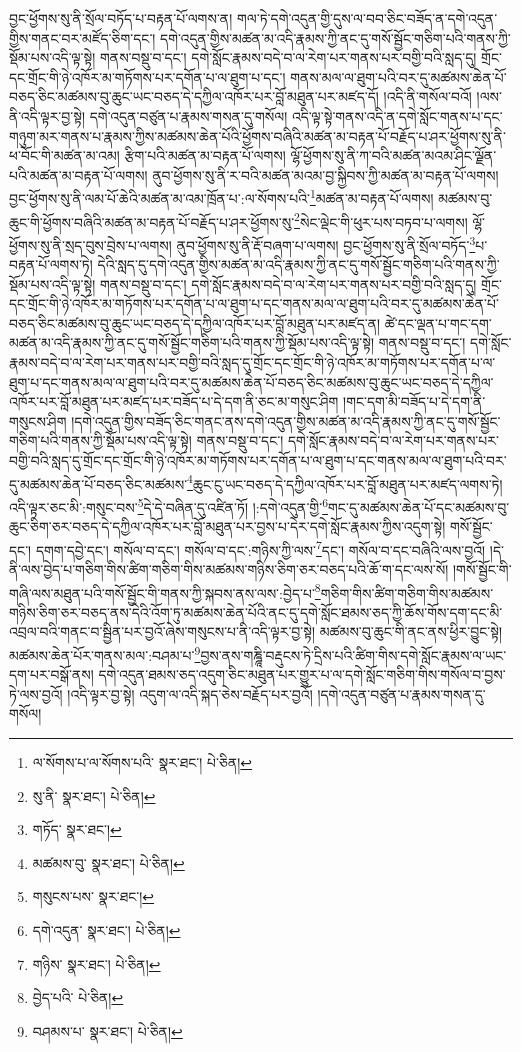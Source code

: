བྱང་ཕྱོགས་སུ་ནི་སྲོལ་བཏོད་པ་བརྟན་པོ་ལགས་ན། གལ་ཏེ་དགེ་འདུན་གྱི་དུས་ལ་བབ་ཅིང་བཟོད་ན་དགེ་འདུན་གྱིས་གནང་བར་མཛོད་ཅིག་དང་། དགེ་འདུན་གྱིས་མཚན་མ་འདི་རྣམས་ཀྱི་ནང་དུ་གསོ་སྦྱོང་གཅིག་པའི་གནས་ཀྱི་སྡོམ་པས་འདི་ལྟ་སྟེ། གནས་བསྡུ་བ་དང་། དགེ་སློང་རྣམས་བདེ་བ་ལ་རེག་པར་གནས་པར་བགྱི་བའི་སླད་དུ། གྲོང་དང་གྲོང་གི་ཉེ་འཁོར་མ་གཏོགས་པར་དགོན་པ་ལ་ཐུག་པ་དང་། གནས་མལ་ལ་ཐུག་པའི་བར་དུ་མཚམས་ཆེན་པོ་བཅད་ཅིང་མཚམས་བུ་ཆུང་ཡང་བཅད་དེ་དཀྱིལ་འཁོར་པར་བློ་མཐུན་པར་མཛད་དོ། །འདི་ནི་གསོལ་བའོ། །ལས་ནི་འདི་ལྟར་བྱ་སྟེ། དགེ་འདུན་བཙུན་པ་རྣམས་གསན་དུ་གསོལ། འདི་ལྟ་སྟེ་གནས་འདི་ན་དགེ་སློང་གནས་པ་དང་གཉུག་མར་གནས་པ་རྣམས་ཀྱིས་མཚམས་ཆེན་པོའི་ཕྱོགས་བཞིའི་མཚན་མ་བརྟན་པོ་བརྗོད་པ་ཤར་ཕྱོགས་སུ་ནི་ཕ་བོང་གི་མཚན་མ་འམ། རྩིག་པའི་མཚན་མ་བརྟན་པོ་ལགས། ལྷོ་ཕྱོགས་སུ་ནི་ཀ་བའི་མཚན་མའམ་ཤིང་ལྗོན་པའི་མཚན་མ་བརྟན་པོ་ལགས། ནུབ་ཕྱོགས་སུ་ནི་ར་བའི་མཚན་མའམ་བྱ་སྐྱིབས་ཀྱི་མཚན་མ་བརྟན་པོ་ལགས། བྱང་ཕྱོགས་སུ་ནི་ལམ་པོ་ཆེའི་མཚན་མ་འམ་ཁྲོན་པ་:ལ་སོགས་པའི་\footnote{ལ་སོགས་པ་ལ་སོགས་པའི་  སྣར་ཐང་།  པེ་ཅིན། }མཚན་མ་བརྟན་པོ་ལགས། མཚམས་བུ་ཆུང་གི་ཕྱོགས་བཞིའི་མཚན་མ་བརྟན་པོ་བརྗོད་པ་ཤར་ཕྱོགས་སུ་\footnote{སུ་ནི་  སྣར་ཐང་།  པེ་ཅིན། }སེང་ལྡེང་གི་ཕུར་པས་བཏབ་པ་ལགས། ལྷོ་ཕྱོགས་སུ་ནི་སྲད་བུས་བྲེས་པ་ལགས། ནུབ་ཕྱོགས་སུ་ནི་རྡོ་བཞག་པ་ལགས། བྱང་ཕྱོགས་སུ་ནི་སྲོལ་བཏོད་\footnote{གཏོད་  སྣར་ཐང་། }པ་བརྟན་པོ་ལགས་ཏེ། དེའི་སླད་དུ་དགེ་འདུན་གྱིས་མཚན་མ་འདི་རྣམས་ཀྱི་ནང་དུ་གསོ་སྦྱོང་གཅིག་པའི་གནས་ཀྱི་སྡོམ་པས་འདི་ལྟ་སྟེ། གནས་བསྡུ་བ་དང་། དགེ་སློང་རྣམས་བདེ་བ་ལ་རེག་པར་གནས་པར་བགྱི་བའི་སླད་དུ། གྲོང་དང་གྲོང་གི་ཉེ་འཁོར་མ་གཏོགས་པར་དགོན་པ་ལ་ཐུག་པ་དང་གནས་མལ་ལ་ཐུག་པའི་བར་དུ་མཚམས་ཆེན་པོ་བཅད་ཅིང་མཚམས་བུ་ཆུང་ཡང་བཅད་དེ་དཀྱིལ་འཁོར་པར་བློ་མཐུན་པར་མཛད་ན། ཚེ་དང་ལྡན་པ་གང་དག་མཚན་མ་འདི་རྣམས་ཀྱི་ནང་དུ་གསོ་སྦྱོང་གཅིག་པའི་གནས་ཀྱི་སྡོམ་པས་འདི་ལྟ་སྟེ། གནས་བསྡུ་བ་དང་། དགེ་སློང་རྣམས་བདེ་བ་ལ་རེག་པར་གནས་པར་བགྱི་བའི་སླད་དུ་གྲོང་དང་གྲོང་གི་ཉེ་འཁོར་མ་གཏོགས་པར་དགོན་པ་ལ་ཐུག་པ་དང་གནས་མལ་ལ་ཐུག་པའི་བར་དུ་མཚམས་ཆེན་པོ་བཅད་ཅིང་མཚམས་བུ་ཆུང་ཡང་བཅད་དེ་དཀྱིལ་འཁོར་པར་བློ་མཐུན་པར་མཛད་པར་བཟོད་པ་དེ་དག་ནི་ཅང་མ་གསུང་ཤིག །གང་དག་མི་བཟོད་པ་དེ་དག་ནི་གསུངས་ཤིག །དགེ་འདུན་གྱིས་བཟོད་ཅིང་གནང་ནས་དགེ་འདུན་གྱིས་མཚན་མ་འདི་རྣམས་ཀྱི་ནང་དུ་གསོ་སྦྱོང་གཅིག་པའི་གནས་ཀྱི་སྡོམ་པས་འདི་ལྟ་སྟེ། གནས་བསྡུ་བ་དང་། དགེ་སློང་རྣམས་བདེ་བ་ལ་རེག་པར་གནས་པར་བགྱི་བའི་སླད་དུ་གྲོང་དང་གྲོང་གི་ཉེ་འཁོར་མ་གཏོགས་པར་དགོན་པ་ལ་ཐུག་པ་དང་གནས་མལ་ལ་ཐུག་པའི་བར་དུ་མཚམས་ཆེན་པོ་བཅད་ཅིང་མཚམས་\footnote{མཚམས་བུ་  སྣར་ཐང་།  པེ་ཅིན། }ཆུང་ངུ་ཡང་བཅད་དེ་དཀྱིལ་འཁོར་པར་བློ་མཐུན་པར་མཛད་ལགས་ཏེ། འདི་ལྟར་ཅང་མི་:གསུང་བས་\footnote{གསུངས་པས་  སྣར་ཐང་། }དེ་དེ་བཞིན་དུ་འཛིན་ཏོ། །:དགེ་འདུན་གྱི་\footnote{དགེ་འདུན་  སྣར་ཐང་།  པེ་ཅིན། }གང་དུ་མཚམས་ཆེན་པོ་དང་མཚམས་བུ་ཆུང་ཅིག་ཅར་བཅད་དེ་དཀྱིལ་འཁོར་པར་བློ་མཐུན་པར་བྱས་པ་དེར་དགེ་སློང་རྣམས་ཀྱིས་འདུག་སྟེ། གསོ་སྦྱོང་དང་། དགག་དབྱེ་དང་། གསོལ་བ་དང་། གསོལ་བ་དང་:གཉིས་ཀྱི་ལས་\footnote{གཉིས་  སྣར་ཐང་།  པེ་ཅིན། }དང་། གསོལ་བ་དང་བཞིའི་ལས་བྱའོ། །དེ་ནི་ལས་བྱེད་པ་གཅིག་གིས་ཚིག་གཅིག་གིས་མཚམས་གཉིས་ཅིག་ཅར་བཅད་པའི་ཆོ་ག་དང་ལས་སོ། །གསོ་སྦྱོང་གི་གཞི་ལས་མཐུན་པའི་གསོ་སྦྱོང་གི་གནས་ཀྱི་སྐབས་ནས་ལས་:བྱེད་པ་\footnote{བྱེད་པའི་  པེ་ཅིན། }གཅིག་གིས་ཚིག་གཅིག་གིས་མཚམས་གཉིས་ཅིག་ཅར་བཅད་ནས་དེའི་འོག་ཏུ་མཚམས་ཆེན་པོའི་ནང་དུ་དགེ་སློང་ཐམས་ཅད་ཀྱི་ཆོས་གོས་དག་དང་མི་འབྲལ་བའི་གནང་བ་སྦྱིན་པར་བྱའོ་ཞེས་གསུངས་པ་ནི་འདི་ལྟར་བྱ་སྟེ། མཚམས་བུ་ཆུང་གི་ནང་ནས་ཕྱིར་བྱུང་སྟེ། མཚམས་ཆེན་པོར་གནས་མལ་:བཤམ་པ་\footnote{བཤམས་པ་  སྣར་ཐང་།  པེ་ཅིན། }བྱས་ནས་གཎྜཱི་བརྡུངས་ཏེ་དྲིས་པའི་ཚིག་གིས་དགེ་སློང་རྣམས་ལ་ཡང་དག་པར་བསྒོ་ནས། དགེ་འདུན་ཐམས་ཅད་འདུག་ཅིང་མཐུན་པར་གྱུར་པ་ལ་དགེ་སློང་གཅིག་གིས་གསོལ་བ་བྱས་ཏེ་ལས་བྱའོ། །འདི་ལྟར་བྱ་སྟེ། འདུག་ལ་འདི་སྐད་ཅེས་བརྗོད་པར་བྱའོ། །དགེ་འདུན་བཙུན་པ་རྣམས་གསན་དུ་གསོལ། 